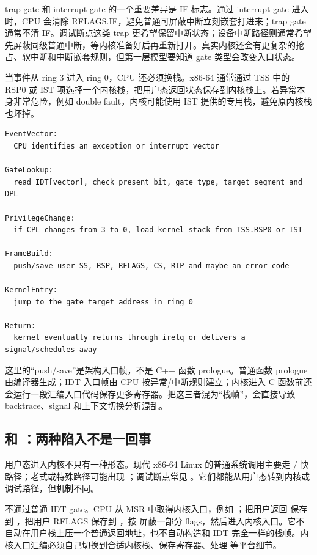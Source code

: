 trap gate 和 interrupt gate 的一个重要差异是 IF 标志。通过 interrupt gate 进入时，CPU 会清除 RFLAGS.IF，避免普通可屏蔽中断立刻嵌套打进来；trap gate 通常不清 IF。调试断点这类 trap 更希望保留中断状态；设备中断路径则通常希望先屏蔽同级普通中断，等内核准备好后再重新打开。真实内核还会有更复杂的抢占、软中断和中断嵌套规则，但第一层模型要知道 gate 类型会改变入口状态。

当事件从 ring 3 进入 ring 0，CPU 还必须换栈。x86-64 通常通过 TSS 中的 RSP0 或 IST 项选择一个内核栈，把用户态返回状态保存到内核栈上。若异常本身非常危险，例如 double fault，内核可能使用 IST 提供的专用栈，避免原内核栈也坏掉。

\begin{lstlisting}[numbers=none,caption={IDT 入口的压缩状态机}]
EventVector:
  CPU identifies an exception or interrupt vector

GateLookup:
  read IDT[vector], check present bit, gate type, target segment and DPL

PrivilegeChange:
  if CPL changes from 3 to 0, load kernel stack from TSS.RSP0 or IST

FrameBuild:
  push/save user SS, RSP, RFLAGS, CS, RIP and maybe an error code

KernelEntry:
  jump to the gate target address in ring 0

Return:
  kernel eventually returns through iretq or delivers a signal/schedules away
\end{lstlisting}

这里的“push/save”是架构入口帧，不是 C++ 函数 prologue。普通函数 prologue 由编译器生成；IDT 入口帧由 CPU 按异常/中断规则建立；内核进入 C 函数前还会运行一段汇编入口代码保存更多寄存器。把这三者混为“栈帧”，会直接导致 backtrace、signal 和上下文切换分析混乱。

\subsection{ 和 ：两种陷入不是一回事}

用户态进入内核不只有一种形态。现代 x86-64 Linux 的普通系统调用主要走 / 快路径；老式或特殊路径可能出现 ；调试断点常见 。它们都能从用户态转到内核或调试路径，但机制不同。

 不通过普通 IDT gate。CPU 从 MSR 中取得内核入口，例如 ；把用户返回  保存到 ，把用户 RFLAGS 保存到 ，按  屏蔽一部分 flags，然后进入内核入口。它不自动在用户栈上压一个普通返回地址，也不自动构造和 IDT 完全一样的栈帧。内核入口汇编必须自己切换到合适内核栈、保存寄存器、处理  等平台细节。

